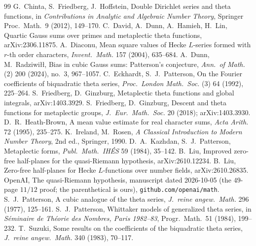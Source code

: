 \documentclass[11pt]{article}
\begin{document}
\begin{thebibliography}{99}
 G.~Chinta, S.~Friedberg, J.~Hoffstein, Double Dirichlet series and theta functions, in \emph{Contributions in Analytic and Algebraic Number Theory}, Springer Proc.\ Math.\ 9 (2012), 149--170.
 C.~David, A.~Dunn, A.~Hamieh, H.~Lin, Quartic Gauss sums over primes and metaplectic theta functions, arXiv:2306.11875.
 A.~Diaconu, Mean square values of Hecke $L$-series formed with $r$-th order characters, \emph{Invent.\ Math.} 157 (2004), 635--684.
 A.~Dunn, M.~Radziwi\l\l, Bias in cubic Gauss sums: Patterson's conjecture, \emph{Ann.\ of Math.} (2) 200 (2024), no.~3, 967--1057.
 C.~Eckhardt, S.~J.~Patterson, On the Fourier coefficients of biquadratic theta series, \emph{Proc.\ London Math.\ Soc.} (3) 64 (1992), 225--264.
 S.~Friedberg, D.~Ginzburg, Metaplectic theta functions and global integrals, arXiv:1403.3929.
 S.~Friedberg, D.~Ginzburg, Descent and theta functions for metaplectic groups, \emph{J.\ Eur.\ Math.\ Soc.} 20 (2018); arXiv:1403.3930.
 D.~R.~Heath-Brown, A mean value estimate for real character sums, \emph{Acta Arith.} 72 (1995), 235--275.
 K.~Ireland, M.~Rosen, \emph{A Classical Introduction to Modern Number Theory}, 2nd ed., Springer, 1990.
 D.~A.~Kazhdan, S.~J.~Patterson, Metaplectic forms, \emph{Publ.\ Math.\ IH\'ES} 59 (1984), 35--142.
 B.~Liu, Improved zero-free half-planes for the quasi-Riemann hypothesis, arXiv:2610.12234.
 B.~Liu, Zero-free half-planes for Hecke $L$-functions over number fields, arXiv:2610.26835.
 OpenAI, The quasi-Riemann hypothesis, manuscript dated 2026-10-05 (the $49$-page $11/12$ proof; the parenthetical is ours), \texttt{github.com/openai/math}.
 S.~J.~Patterson, A cubic analogue of the theta series, \emph{J.\ reine angew.\ Math.} 296 (1977), 125--161.
 S.~J.~Patterson, Whittaker models of generalized theta series, in \emph{S\'eminaire de Th\'eorie des Nombres, Paris 1982--83}, Progr.\ Math.\ 51 (1984), 199--232.
 T.~Suzuki, Some results on the coefficients of the biquadratic theta series, \emph{J.\ reine angew.\ Math.} 340 (1983), 70--117.
\end{thebibliography}
\end{document}
